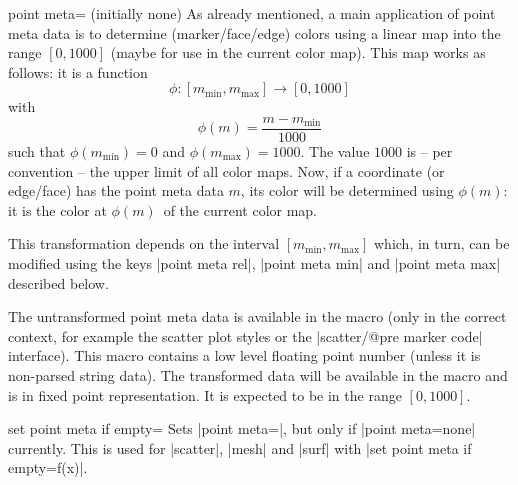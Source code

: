 \begin{pgfplotskey}{point meta= (initially none)}
	As already mentioned, a main application of point meta data is to determine (marker/face/edge) colors using a linear map into the range $[0,1000]$ (maybe for use in the current color map). This map works as follows: it is a function
	\[ \phi\colon [m_{\text{min}},m_{\text{max}}] \to [0,1000] \]
	with
	\[ \phi(m) = \frac{m - m_{\text{min}}} {1000} \]
	such that $\phi(m_{\text{min}}) = 0$ and $\phi(m_{\text{max}})=1000$. The value $1000$ is -- per convention -- the upper limit of all color maps. Now, if a coordinate (or edge/face) has the point meta data $m$, its color will be determined using $\phi(m)$: it is the color at $\phi(m)$\textperthousand\ of the current color map.

	This transformation depends on the interval $[m_{\text{min}},m_{\text{max}}]$ which, in turn, can be modified using the keys |point meta rel|, |point meta min| and |point meta max| described below.

	The untransformed point meta data is available in the macro \declareandlabel{\pgfplotspointmeta} (only in the correct context, for example the scatter plot styles or the |scatter/@pre marker code| interface). This macro contains a low level floating point number (unless it is non-parsed string data). The transformed data will be available in the macro \declareandlabel{\pgfplotspointmetatransformed} and is in fixed point representation. It is expected to be in the range $[0,1000]$.

\end{pgfplotskey}

\begin{pgfplotskey}{set point meta if empty=}
	Sets |point meta=|, but only if |point meta=none| currently. This is used for |scatter|, |mesh| and |surf| with |set point meta if empty=f(x)|.
\end{pgfplotskey}

